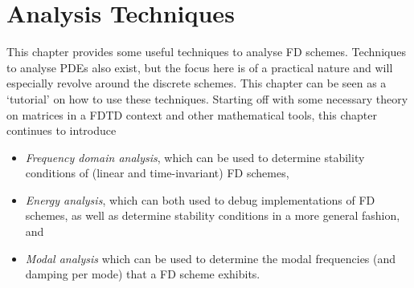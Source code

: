 \chapter{Analysis Techniques}\label{ch:analysis}
This chapter provides some useful techniques to analyse FD schemes. Techniques to analyse PDEs also exist, but the focus here is of a practical nature and will especially revolve around the discrete schemes. This chapter can be seen as a `tutorial' on how to use these techniques. 
Starting off with some necessary theory on matrices in a FDTD context and other mathematical tools, this chapter continues to introduce 
\begin{itemize}
    \item \textit{Frequency domain analysis}, which can be used to determine stability conditions of (linear and time-invariant) FD schemes,
    \item \textit{Energy analysis}, which can both used to debug implementations of FD schemes, as well as determine stability conditions in a more general fashion, and
    \item \textit{Modal analysis} which can be used to determine the modal frequencies (and damping per mode) that a FD scheme exhibits.
\end{itemize}

